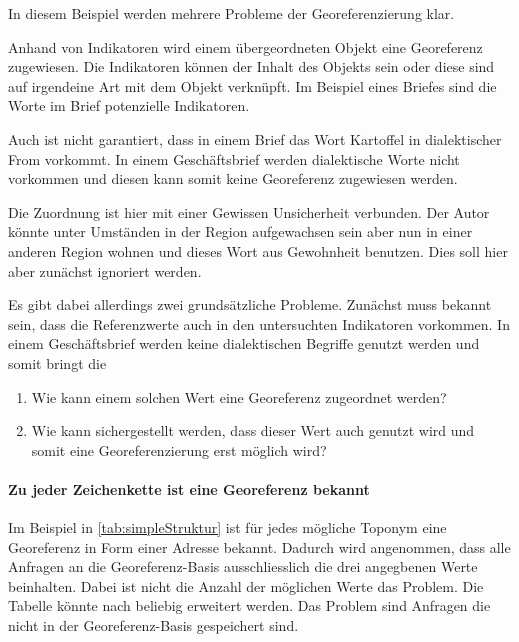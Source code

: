 				In diesem Beispiel werden mehrere Probleme der Georeferenzierung klar. 

				Anhand von Indikatoren wird einem übergeordneten Objekt eine Georeferenz zugewiesen. 
				Die Indikatoren können der Inhalt des Objekts sein oder diese sind auf irgendeine Art mit dem Objekt verknüpft.
				Im Beispiel eines Briefes sind die Worte im Brief potenzielle Indikatoren.



				Auch ist nicht garantiert, dass in einem Brief das Wort Kartoffel in dialektischer From vorkommt.
				In einem Geschäftsbrief werden dialektische Worte nicht vorkommen und diesen kann somit keine Georeferenz zugewiesen werden.


				Die Zuordnung ist hier mit einer Gewissen Unsicherheit verbunden. 
				Der Autor könnte unter Umständen in der Region aufgewachsen sein aber nun in einer anderen Region wohnen und dieses Wort aus Gewohnheit benutzen.
				Dies soll hier aber zunächst ignoriert werden. 


		
		
		Es gibt dabei allerdings zwei grundsätzliche Probleme.
		Zunächst muss bekannt sein, dass die Referenzwerte auch in den untersuchten Indikatoren vorkommen.
		In einem Geschäftsbrief werden keine dialektischen Begriffe genutzt werden und somit bringt die


		\begin{enumerate}
			\item Wie kann einem solchen Wert eine Georeferenz zugeordnet werden?
			\item Wie kann sichergestellt werden, dass dieser Wert auch genutzt wird und somit eine Georeferenzierung erst möglich wird?
		\end{enumerate}




			\paragraph{Zu jeder Zeichenkette ist eine Georeferenz bekannt}

				Im Beispiel in \ref{tab:simpleStruktur} ist für jedes mögliche Toponym eine Georeferenz in Form einer Adresse bekannt.
				Dadurch wird angenommen, dass alle Anfragen an die Georeferenz-Basis ausschliesslich die drei angegbenen Werte beinhalten. 
				Dabei ist nicht die Anzahl der möglichen Werte das Problem.
				Die Tabelle könnte nach beliebig erweitert werden.
				Das Problem sind Anfragen die nicht in der Georeferenz-Basis gespeichert sind.

